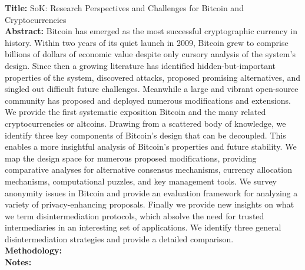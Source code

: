 \documentclass[a4paper, 12pt]{scrartcl}
\begin{document}
\textbf{Title:} SoK: Research Perspectives and Challenges for Bitcoin and Cryptocurrencies \parencite{bonneau2015sok} \\
\textbf{Abstract:} Bitcoin has emerged as the most successful cryptographic
currency in history. Within two years of its quiet launch
in 2009, Bitcoin grew to comprise billions of dollars of economic
value despite only cursory analysis of the system’s design. Since
then a growing literature has identified hidden-but-important
properties of the system, discovered attacks, proposed promising
alternatives, and singled out difficult future challenges.
Meanwhile a large and vibrant open-source community has
proposed and deployed numerous modifications and extensions.
We provide the first systematic exposition Bitcoin and the
many related cryptocurrencies or altcoins. Drawing from a
scattered body of knowledge, we identify three key components
of Bitcoin’s design that can be decoupled. This enables a more
insightful analysis of Bitcoin’s properties and future stability.
We map the design space for numerous proposed modifications,
providing comparative analyses for alternative consensus
mechanisms, currency allocation mechanisms, computational
puzzles, and key management tools. We survey anonymity
issues in Bitcoin and provide an evaluation framework for
analyzing a variety of privacy-enhancing proposals. Finally
we provide new insights on what we term disintermediation
protocols, which absolve the need for trusted intermediaries
in an interesting set of applications. We identify three general
disintermediation strategies and provide a detailed comparison.\\
\textbf{Methodology:} \\
\textbf{Notes:}
\end{document}
